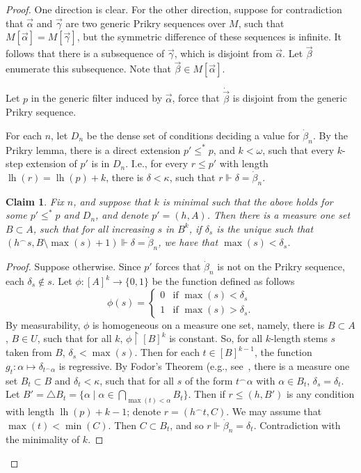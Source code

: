 \documentclass{amsart}
\newcommand{\lh}{\operatorname{lh}}
\newcommand{\cat}{^\frown}
\newtheorem{claim}{Claim}[theorem]
\theoremstyle{definition}
\theoremstyle{remark}
\begin{document}
\begin{proof}
One direction is clear. For the other direction, suppose for contradiction that $\vec{\alpha}$ and $\vec{\gamma}$ are two generic Prikry sequences over $M$, such that $M[\vec{\alpha}]=M[\vec{\gamma}]$, but the symmetric difference of these sequences is infinite. It follows that there is a subsequence of $\vec{\gamma}$, which is disjoint from $\vec{\alpha}$. Let $\vec{\beta}$ enumerate this subsequence. Note that $\vec{\beta}\in M[\vec{\alpha}]$.


Let $p$ in the generic filter induced by $\vec{\alpha}$, force that $\dot{\vec{\beta}}$ is disjoint from the generic Prikry sequence. 

For each $n$, let $D_n$ be the dense set of conditions deciding a value for $\dot{\beta}_n$. By the Prikry lemma, there is a direct extension $p'\leq^*p$, and $k<\omega$, such that every $k$-step extension of $p'$ is in $D_n$. I.e., for every $r\leq p'$ with length $\lh(r)=\lh(p)+k$, there is $\delta<\kappa$, such that $r\Vdash \delta=\dot{\beta}_n$.

\begin{claim}
Fix $n$, and suppose that $k$ is minimal such that the above holds for some $p'\leq^*p$ and $D_n$, and denote $p' = (h, A)$. Then there is a measure one set $B\subset A$, such that for all increasing $s$ in $B^k$, if $\delta_s$ is the unique such that $(h\cat s, B\setminus \max(s)+1)\Vdash\delta=\dot{\beta}_n$, we have that $\max(s)<\delta_s$.
\end{claim}
\begin{proof}
Suppose otherwise. Since $p'$ forces that $\dot{\beta}_n$ is not on the Prikry sequence, each $\delta_s\notin s$.  Let $\phi\colon[A]^k\rightarrow \{0,1\}$ be the function defined as follows
\[
\phi(s) = 
\begin{cases}
0 & \text{if $\max(s)<\delta_s$}\\
1 & \text{if $\max(s)>\delta_s$}.
\end{cases}
\]
By measurability, $\phi$ is homogeneous on a measure one set, namely, there is $B\subset A$, $B\in U$, such that for all $k$, $\phi\upharpoonright [B]^k$ is constant. So, for all $k$-length stems $s$ taken from $B$, $\delta_s<\max(s)$. Then for each $t\in [B]^{k-1}$, the function $g_t\colon \alpha\mapsto \delta_{t\cat\alpha}$ is regressive. By Fodor's Theorem (e.g., see~\cite[Theorem~8.7]{Jec}, there is a measure one set $B_t\subset B$ and $\delta_t<\kappa$, such that for all $s$ of the form $t\cat\alpha$ with $\alpha\in B_t$, $\delta_s=\delta_t$. Let $B'=\triangle B_t = \{\alpha\mid \alpha\in\bigcap_{\max(t)<\alpha} B_t\}$. Then if $r\leq (h, B')$ is any condition with length $\lh(p)+k-1$; denote $r = (h\cat t, C)$. We may assume that $\max(t)<\min(C)$.  Then $C\subset B_t$, and so $r\Vdash \dot{\beta}_n=\delta_t$. Contradiction with the minimality of $k$.
\end{proof}




\end{proof}
\end{document}
